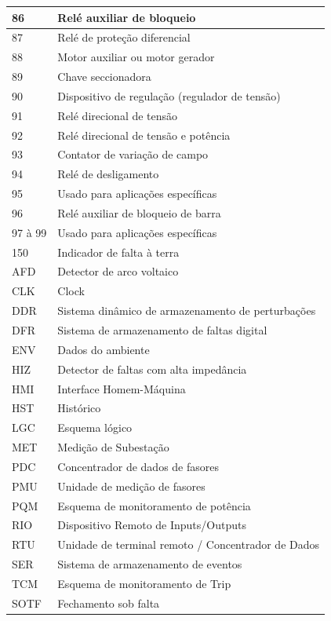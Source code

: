 \documentclass[a5paper,english,spanish,brazil]{ufsc-thesis}
\begin{document}
\begin{longtable}{|l|p{}|}
		  86 & Relé auxiliar de bloqueio \\ \hline
		  87 & Relé de proteção diferencial \\ \hline
		  88 & Motor auxiliar ou motor gerador \\ \hline
		  89 & Chave seccionadora \\ \hline
		  90 & Dispositivo de regulação (regulador de tensão) \\ \hline
		  91 & Relé direcional de tensão \\ \hline
		  92 & Relé direcional de tensão e potência \\ \hline
		  93 & Contator de variação de campo \\ \hline
		  94 & Relé de desligamento \\ \hline
		  95 & Usado para aplicações específicas  \\ \hline
		  96 & Relé auxiliar de bloqueio de barra  \\ \hline
		  97 à 99 & Usado para aplicações específicas  \\ \hline
		  150 & Indicador de falta à terra  \\ \hline
		  AFD & Detector de arco voltaico  \\ \hline
		  CLK & Clock  \\ \hline
		  DDR & Sistema dinâmico de armazenamento de perturbações  \\ \hline
		  DFR & Sistema de armazenamento de faltas digital  \\ \hline
		  ENV & Dados do ambiente  \\ \hline
		  HIZ & Detector de faltas com alta impedância  \\ \hline
		  HMI & Interface Homem-Máquina  \\ \hline
		  HST & Histórico  \\ \hline
		  LGC & Esquema lógico  \\ \hline
		  MET & Medição de Subestação  \\ \hline
		  PDC & Concentrador de dados de fasores  \\ \hline
		  PMU & Unidade de medição de fasores  \\ \hline
		  PQM & Esquema de monitoramento de potência  \\ \hline
		  RIO & Dispositivo Remoto de Inputs/Outputs  \\ \hline
		  RTU & Unidade de terminal remoto / Concentrador de Dados  \\ \hline
		  SER & Sistema de armazenamento de eventos  \\ \hline
		  TCM & Esquema de monitoramento de Trip  \\ \hline
		  SOTF & Fechamento sob falta  \\ \hline
		\end{longtable}
\end{document}
